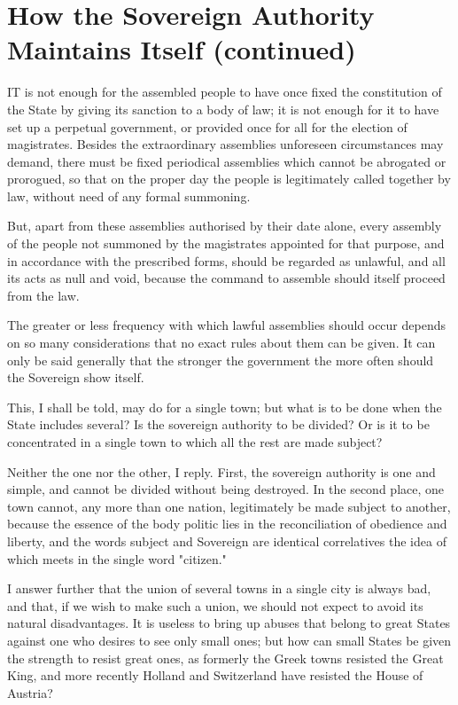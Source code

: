 \documentclass[12pt]{book}
\begin{document}
\section{How the Sovereign Authority Maintains Itself (continued)}

IT is not enough for the assembled people to have once fixed the constitution of the State by giving its sanction to a body of law; it is not enough for it to have set up a perpetual government, or provided once for all for the election of magistrates. Besides the extraordinary assemblies unforeseen circumstances may demand, there must be fixed periodical assemblies which cannot be abrogated or prorogued, so that on the proper day the people is legitimately called together by law, without need of any formal summoning.

But, apart from these assemblies authorised by their date alone, every assembly of the people not summoned by the magistrates appointed for that purpose, and in accordance with the prescribed forms, should be regarded as unlawful, and all its acts as null and void, because the command to assemble should itself proceed from the law.

The greater or less frequency with which lawful assemblies should occur depends on so many considerations that no exact rules about them can be given. It can only be said generally that the stronger the government the more often should the Sovereign show itself.

This, I shall be told, may do for a single town; but what is to be done when the State includes several? Is the sovereign authority to be divided? Or is it to be concentrated in a single town to which all the rest are made subject?

Neither the one nor the other, I reply. First, the sovereign authority is one and simple, and cannot be divided without being destroyed. In the second place, one town cannot, any more than one nation, legitimately be made subject to another, because the essence of the body politic lies in the reconciliation of obedience and liberty, and the words subject and Sovereign are identical correlatives the idea of which meets in the single word "citizen."

I answer further that the union of several towns in a single city is always bad, and that, if we wish to make such a union, we should not expect to avoid its natural disadvantages. It is useless to bring up abuses that belong to great States against one who desires to see only small ones; but how can small States be given the strength to resist great ones, as formerly the Greek towns resisted the Great King, and more recently Holland and Switzerland have resisted the House of Austria?
\end{document}
